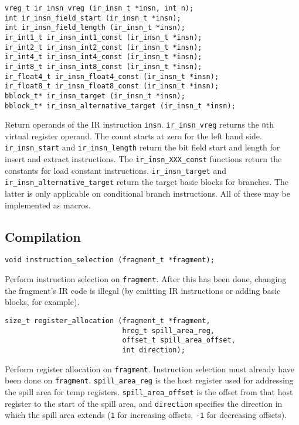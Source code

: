 \documentclass{article}
\newcommand{\cc}[1]{\texttt{#1}} %
\begin{document}
\begin{verbatim}
vreg_t ir_insn_vreg (ir_insn_t *insn, int n);
int ir_insn_field_start (ir_insn_t *insn);
int ir_insn_field_length (ir_insn_t *insn);
ir_int1_t ir_insn_int1_const (ir_insn_t *insn);
ir_int2_t ir_insn_int2_const (ir_insn_t *insn);
ir_int4_t ir_insn_int4_const (ir_insn_t *insn);
ir_int8_t ir_insn_int8_const (ir_insn_t *insn);
ir_float4_t ir_insn_float4_const (ir_insn_t *insn);
ir_float8_t ir_insn_float8_const (ir_insn_t *insn);
bblock_t* ir_insn_target (ir_insn_t *insn);
bblock_t* ir_insn_alternative_target (ir_insn_t *insn);
\end{verbatim}

Return operands of the IR instruction \cc{insn}.  \cc{ir\_insn\_vreg}
returns the \cc{n}th virtual register operand.  The count starts at
zero for the left hand side.  \cc{ir\_insn\_start} and
\cc{ir\_insn\_length} return the bit field start and length for
insert and extract instructions.  The \cc{ir\_insn\_XXX\_const}
functions return the constants for load constant instructions.
\cc{ir\_insn\_target} and \cc{ir\_insn\_alternative\_target} return
the target basic blocks for branches.  The latter is only applicable
on conditional branch instructions.  All of these may be implemented
as macros.

\subsection{Compilation}

\begin{verbatim}
void instruction_selection (fragment_t *fragment);
\end{verbatim}

Perform instruction selection on \cc{fragment}.  After this has been
done, changing the fragment's IR code is illegal (by emitting IR
instructions or adding basic blocks, for example).

\begin{verbatim}
size_t register_allocation (fragment_t *fragment,
                            hreg_t spill_area_reg,
                            offset_t spill_area_offset,
                            int direction);
\end{verbatim}

Perform register allocation on \cc{fragment}.  Instruction selection
must already have been done on \cc{fragment}.  \cc{spill\_area\_reg}
is the host register used for addressing the spill area for temp
registers.  \cc{spill\_area\_offset} is the offset from that host
register to the start of the spill area, and \cc{direction} specifies
the direction in which the spill area extends (\cc{1} for increasing
offsets, \cc{-1} for decreasing offsets).
\end{document}
